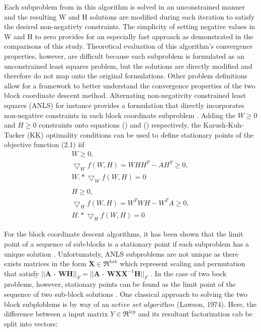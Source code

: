 \documentclass[final,leqno,onefignum,onetabnum]{siamltex1213}
\begin{document}
Each subproblem from in this algorithm is solved in an unconstrained manner and the resulting W and H solutions are modified during each iteration to satisfy the desired non-negativty constraints. The simplicity of setting negative values in W and H to zero provides for an especially fast approach as demonstrated in the comparisons of this study. Theoretical evaluation of this algorithm's convergence properties, however, are difficult because each subproblem is formulated as an unconstrained least squares problem, but the solutions are directly modified and therefore do not map onto the original formulations. Other problem definitions allow for a framework to better understand the convergence properties of the two block coordinate descent method. Alternating non-negativity constrained least squares (ANLS) for instance provides a formulation that directly incorporates non-negative constraints in each block coordinate subproblem . Adding the $W \ge 0$ and  $ H \ge 0 $ constraints onto equations () and () respectively, the Karush-Kuh-Tucker (KK) optimality conditions can be used to define stationary points of the objective function (2.1) iif
\begin{equation}\label{EKx}
 \begin{align}
  W \ge 0,\\
  \bigtriangledown_W f(W,H)  = WHH^T - AH^T \ge 0,\\
  W.* \bigtriangledown_Wf(W,H) = 0\\ \\
    H \ge 0,\\ 
  \bigtriangledown_H f(W,H)  = W^T WH - W^T A \ge 0,\\
  H.* \bigtriangledown_Hf(W,H) = 0  
  \end{align}
\end{equation}

For the block coordinate descent algorithms, it has been shown that the limit point of a sequence of sub-blocks is a stationary point if each subproblem has a unique solution \cite{Ber2}. Unfortunately, ANLS subproblems are not unique as there exists matrices in the form $ \textbf{X} \in \Re^{kxk} $ which represent scaling and permutation that satisfy $ || \textbf{A - WH} ||_{F} = || \textbf{A - WXX}^{-1} \textbf{H} ||_{F} $ \cite{Kim1}.  In the case of two bock problems, however, stationary points can be found as the limit point of the sequence of two sub-block solutions \cite{Gri}. One classical approach to solving the two block subploblems is by way of an $\textit{active set algorithm}$ (Lawson, 1974). Here, the difference between a input matrix $ Y \in \Re^{lxp}$  and its resultant factorization cab be split into vectors:
\end{document}
